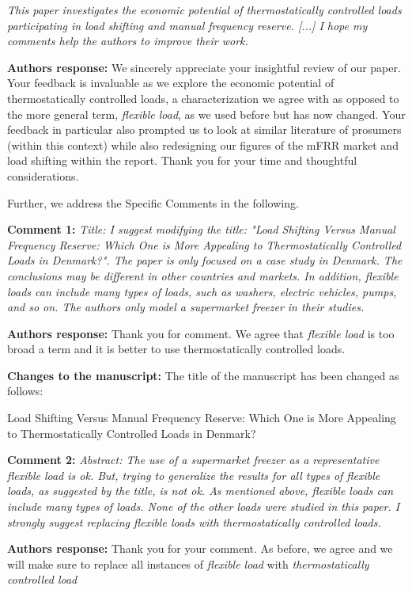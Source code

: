 \documentclass[10pt]{article}
\newcommand{\nt}[1]{\textcolor{newtextcolor}{#1}}
\newcommand{\auth}{\textbf{Authors response: }}
\newcommand{\changes}{\textbf{Changes to the manuscript: }}
\begin{document}
\textit{This paper investigates the economic potential of thermostatically controlled loads participating in load shifting and manual frequency reserve. [...] I hope my comments help the authors to improve their work. }

\auth We sincerely appreciate your insightful review of our paper. Your feedback is invaluable as we explore the economic potential of thermostatically controlled loads, a characterization we agree with as opposed to the more general term, \textit{flexible load}, as we used before but has now changed. Your feedback in particular also prompted us to look at similar literature of prosumers (within this context) while also redesigning our figures of the mFRR market and load shifting within the report. Thank you for your time and thoughtful considerations.

Further, we address the Specific Comments in the following.

\textbf{Comment 1:} \textit{Title: I suggest modifying the title: "Load Shifting Versus Manual Frequency Reserve: Which One is More Appealing to Thermostatically Controlled Loads in Denmark?". The paper is only focused on a case study in Denmark. The conclusions may be different in other countries and markets. In addition, flexible loads can include many types of loads, such as washers, electric vehicles, pumps, and so on. The authors only model a supermarket freezer in their studies.}

\auth Thank you for comment. We agree that \textit{flexible load} is too broad a term and it is better to use thermostatically controlled loads.

\changes The title of the manuscript has been changed as follows:

\nt{Load Shifting Versus Manual Frequency Reserve:  Which One is More Appealing to Thermostatically Controlled Loads in Denmark?}

\textbf{Comment 2:} \textit{Abstract: The use of a supermarket freezer as a representative flexible load is ok. But, trying to generalize the results for all types of flexible loads, as suggested by the title, is not ok. As mentioned above, flexible loads can include many types of loads. None of the other loads were studied in this paper. I strongly suggest replacing flexible loads with thermostatically controlled loads.}

\auth Thank you for your comment. As before, we agree and we will make sure to replace all instances of \textit{flexible load} with \textit{thermostatically controlled load}
\end{document}
